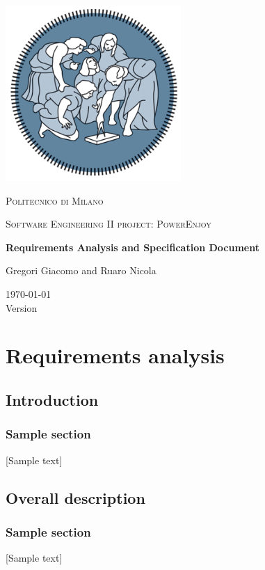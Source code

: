 \documentclass[openright]{report}
\begin{document}
	\begin{titlepage}
		\centering
		\includegraphics[width=0.50\textwidth]{polimi}\\\vspace{0.25cm}
		{\scshape\LARGE Politecnico di Milano\par}\vspace{0.25cm}
		{\scshape\Large Software Engineering II project: PowerEnjoy\par}\vspace{1.5cm}
		{\huge\bfseries Requirements Analysis and Specification Document\par}\vspace{1cm}
		{\large Gregori Giacomo and Ruaro Nicola\par}\vfill

		{\large \today \\Version \version}
	\end{titlepage}

    
    \tableofcontents

    \part{Requirements analysis}
    \chapter{Introduction}
    \section{Sample section}
		[Sample text]
    \chapter{Overall description}
    \section{Sample section}
		[Sample text]
\end{document}
